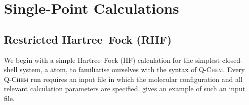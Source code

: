 \renewcommand*{\codelocation}{codesnippets/singlepoint}

\section{Single-Point Calculations}

		\subsection{Restricted Hartree--Fock (RHF)}
	
			We begin with a simple Hartree--Fock (HF) calculation for the simplest closed-shell system, a  atom, to familiarise ourselves with the syntax of \textsc{Q-Chem}.
			Every \textsc{Q-Chem} run requires an input file in which the molecular configuration and all relevant calculation parameters are specified.
			 gives an example of such an input file.
				
			
